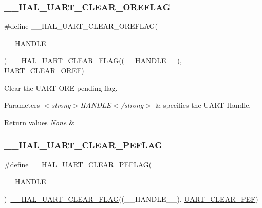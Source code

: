 \subsubsection{\texorpdfstring{\_\_HAL\_UART\_CLEAR\_OREFLAG}{\_\_HAL\_UART\_CLEAR\_OREFLAG}}
{\footnotesize\ttfamily \#define \+\_\+\+\_\+\+H\+A\+L\+\_\+\+U\+A\+R\+T\+\_\+\+C\+L\+E\+A\+R\+\_\+\+O\+R\+E\+F\+L\+AG(\begin{DoxyParamCaption}\item[{}]{\+\_\+\+\_\+\+H\+A\+N\+D\+L\+E\+\_\+\+\_\+ }\end{DoxyParamCaption})~\mbox{\hyperlink{group___u_a_r_t___exported___macros_ga9bd035161d41cde4f2568c7af06493bf}{\+\_\+\+\_\+\+H\+A\+L\+\_\+\+U\+A\+R\+T\+\_\+\+C\+L\+E\+A\+R\+\_\+\+F\+L\+AG}}((\+\_\+\+\_\+\+H\+A\+N\+D\+L\+E\+\_\+\+\_\+), \mbox{\hyperlink{group___u_a_r_t___i_t___c_l_e_a_r___flags_ga3bc97b70293f9a7bf8cc21a74094afad}{U\+A\+R\+T\+\_\+\+C\+L\+E\+A\+R\+\_\+\+O\+R\+EF}})}



Clear the U\+A\+RT O\+RE pending flag. 


\begin{DoxyParams}{Parameters}
{\em $<$strong$>$\+H\+A\+N\+D\+L\+E$<$/strong$>$} & specifies the U\+A\+RT Handle. \\
\hline
\end{DoxyParams}

\begin{DoxyRetVals}{Return values}
{\em None} & \\
\hline
\end{DoxyRetVals}
\mbox{\label{group___u_a_r_t___exported___macros_gaba5e19c60e0f37341b1585a380b84d49}} 
\subsubsection{\texorpdfstring{\_\_HAL\_UART\_CLEAR\_PEFLAG}{\_\_HAL\_UART\_CLEAR\_PEFLAG}}
{\footnotesize\ttfamily \#define \+\_\+\+\_\+\+H\+A\+L\+\_\+\+U\+A\+R\+T\+\_\+\+C\+L\+E\+A\+R\+\_\+\+P\+E\+F\+L\+AG(\begin{DoxyParamCaption}\item[{}]{\+\_\+\+\_\+\+H\+A\+N\+D\+L\+E\+\_\+\+\_\+ }\end{DoxyParamCaption})~\mbox{\hyperlink{group___u_a_r_t___exported___macros_ga9bd035161d41cde4f2568c7af06493bf}{\+\_\+\+\_\+\+H\+A\+L\+\_\+\+U\+A\+R\+T\+\_\+\+C\+L\+E\+A\+R\+\_\+\+F\+L\+AG}}((\+\_\+\+\_\+\+H\+A\+N\+D\+L\+E\+\_\+\+\_\+), \mbox{\hyperlink{group___u_a_r_t___i_t___c_l_e_a_r___flags_ga9c2aef8048dd09ea5e72d69c63026f02}{U\+A\+R\+T\+\_\+\+C\+L\+E\+A\+R\+\_\+\+P\+EF}})}



